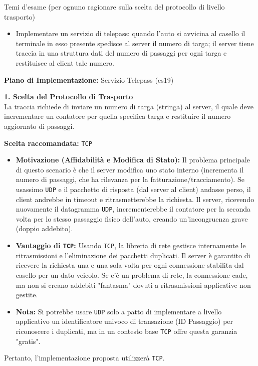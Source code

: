\documentclass[11pt]{article}
\begin{document}
\begin{tcolorbox}[colback=blue!5!white,colframe=blue!75!black,title=\textbf{DOMANDA}, breakable]
Temi d'esame (per ognuno ragionare sulla scelta del protocollo di livello trasporto)
\begin{itemize}
    \item Implementare un servizio di telepass: quando l'auto si avvicina al casello il terminale in esso presente spedisce al server il numero di targa; il server tiene traccia in una struttura dati del numero di passaggi per ogni targa e restituisce al client tale numero.
\end{itemize}
\end{tcolorbox}

\begin{tcolorbox}[colback=green!5!white,colframe=green!75!black,title=\textbf{RISPOSTA}, breakable]
\textbf{Piano di Implementazione:} Servizio Telepass (es19)

\textbf{1. Scelta del Protocollo di Trasporto}\\
La traccia richiede di inviare un numero di targa (stringa) al server, il quale deve incrementare un contatore per quella specifica targa e restituire il numero aggiornato di passaggi.

\textbf{Scelta raccomandata:} \texttt{TCP}

\begin{itemize}
    \item \textbf{Motivazione (Affidabilità e Modifica di Stato):} Il problema principale di questo scenario è che il server modifica uno stato interno (incrementa il numero di passaggi, che ha rilevanza per la fatturazione/tracciamento). Se usassimo \texttt{UDP} e il pacchetto di risposta (dal server al client) andasse perso, il client andrebbe in timeout e ritrasmetterebbe la richiesta. Il server, ricevendo nuovamente il datagramma \texttt{UDP}, incrementerebbe il contatore per la seconda volta per lo stesso passaggio fisico dell'auto, creando un'incongruenza grave (doppio addebito).
    \item \textbf{Vantaggio di \texttt{TCP}:} Usando \texttt{TCP}, la libreria di rete gestisce internamente le ritrasmissioni e l'eliminazione dei pacchetti duplicati. Il server è garantito di ricevere la richiesta una e una sola volta per ogni connessione stabilita dal casello per un dato veicolo. Se c'è un problema di rete, la connessione cade, ma non si creano addebiti "fantasma" dovuti a ritrasmissioni applicative non gestite.
    \item \textbf{Nota:} Si potrebbe usare \texttt{UDP} solo a patto di implementare a livello applicativo un identificatore univoco di transazione (ID Passaggio) per riconoscere i duplicati, ma in un contesto base \texttt{TCP} offre questa garanzia "gratis".
\end{itemize}
Pertanto, l'implementazione proposta utilizzerà \texttt{TCP}.


\end{tcolorbox}
\end{document}
